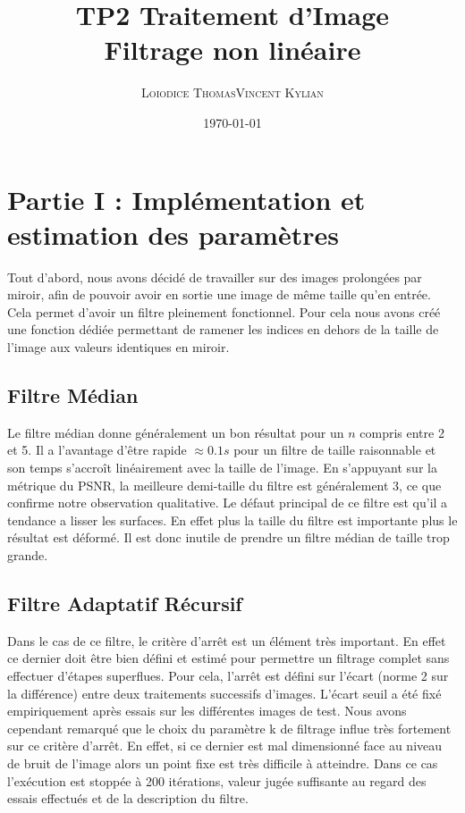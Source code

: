 \documentclass[a4,12pt]{article}
\title{\textbf{TP2 Traitement d'Image\\Filtrage non linéaire}}
\author{
\begin{tabular}{cc}
	\textsc{Loiodice Thomas} & \textsc{Vincent Kylian} \\
\end{tabular}}
\date{\small \today}
\begin{document}
\maketitle



\section{Partie I : Implémentation et estimation des paramètres}

Tout d'abord, nous avons décidé de travailler sur des images prolongées par miroir, afin de pouvoir avoir en sortie une image de même taille qu'en entrée. Cela permet d'avoir un filtre pleinement fonctionnel. Pour cela nous avons créé une fonction dédiée permettant de ramener les indices en dehors de la taille de l'image aux valeurs identiques en miroir.

\subsection{Filtre Médian}

Le filtre médian donne généralement un bon résultat pour un $n$
compris entre 2 et 5. Il a l'avantage d'être rapide $ \approx 0.1 s $
pour un filtre de taille raisonnable et son temps s'accroît linéairement 
avec la taille de l'image.
En s'appuyant sur la métrique du PSNR, la meilleure demi-taille du filtre est généralement 3,
ce que confirme notre observation qualitative. 
Le défaut principal de ce filtre est qu'il a tendance a lisser les surfaces. 
En effet plus la taille du filtre est importante plus le résultat est déformé.
Il est donc inutile de prendre un filtre médian de taille trop grande.

\subsection{Filtre Adaptatif Récursif}
Dans le cas de ce filtre, le critère d'arrêt est un élément très important. En effet ce dernier doit être bien défini et estimé pour permettre un filtrage complet sans effectuer d'étapes superflues. Pour cela, l'arrêt est défini sur l'écart (norme 2 sur la différence) entre deux traitements successifs d'images. L'écart seuil a été fixé empiriquement après essais sur les différentes images de test. Nous avons cependant remarqué que le choix du paramètre k de filtrage influe très fortement sur ce critère d'arrêt. En effet, si ce dernier est mal dimensionné face au niveau de bruit de l'image alors un point fixe est très difficile à atteindre. Dans ce cas l'exécution est stoppée à 200 itérations, valeur jugée suffisante au regard des essais effectués et de la description du filtre.\\
\end{document}
